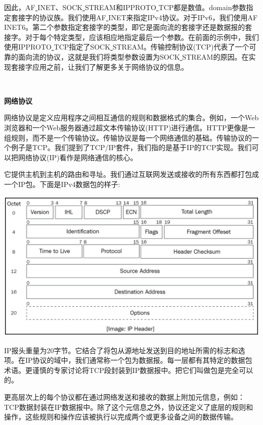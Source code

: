 因此，AF\underline{ }INET、SOCK\underline{ }STREAM和IPPROTO\underline{ }TCP都是数值。domain参数指定套接字的协议族。我们使用AF\underline{ }INET来指定IPv4协议。对于IPv6，我们使用AF\underline{ }INET6。第二个参数指定套接字的类型，即它是面向流的套接字还是数据报的套接字。对于每个特定类型，应该相应地指定最后一个参数。在前面的示例中，我们使用IPPROTO\underline{ }TCP指定了SOCK\underline{ }STREAM。传输控制协议(TCP)代表了一个可靠的面向流的协议，这就是我们将类型参数设置为SOCK\underline{ }STREAM的原因。在实现套接字应用之前，让我们了解更多关于网络协议的信息。 \par

\noindent\textbf{}\ \par
\textbf{网络协议} \ \par
网络协议是定义应用程序之间相互通信的规则和数据格式的集合。例如，一个Web浏览器和一个Web服务器通过超文本传输协议(HTTP)进行通信。HTTP更像是一组规则，而不是一个传输协议。传输协议是每一个网络通信的基础。传输协议的一个例子是TCP。我们提到了TCP/IP套件，我们指的是基于IP的TCP实现。我们可以把网络协议(IP)看作是网络通信的核心。 \par
它提供主机到主机的路由和寻址。我们通过互联网发送或接收的所有东西都打包成一个IP包。下面是IPv4数据包的样子: \par

\begin{center}
	\includegraphics[width=1.0\textwidth]{content/Section-2/Chapter-12/6}
\end{center}

IP报头重量为20字节。它结合了将包从源地址发送到目的地址所需的标志和选项。在IP协议的域中，我们通常称一个包为数据报。每一层都有其特定的数据包术语。更谨慎的专家讨论将TCP段封装到IP数据报中。把它们叫做包是完全可以的。 \par
更高层次上的每个协议都在通过网络发送和接收的数据上附加元信息，例如：TCP数据封装在IP数据报中。除了这个元信息之外，协议还定义了底层的规则和操作，这些规则和操作应该被执行以完成两个或更多设备之间的数据传输。 \par

